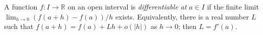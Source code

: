 
A function $f:I\to\mathbb R$ on an open interval is \emph{differentiable at} $a\in I$ if the finite limit $\lim_{h\to0}(f(a+h)-f(a))/h$ exists. Equivalently, there is a real number $L$ such that $f(a+h)=f(a)+Lh+o(|h|)$ as $h\to0$; then $L=f'(a)$.
